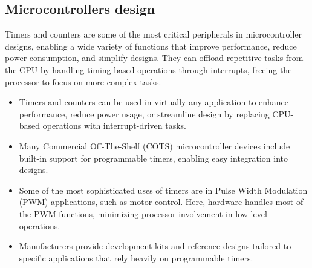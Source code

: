 \subsection{Microcontrollers design}
Timers and counters are some of the most critical peripherals in microcontroller designs, enabling a wide variety of functions that improve performance, reduce power consumption, and simplify designs. 
They can offload repetitive tasks from the CPU by handling timing-based operations through interrupts, freeing the processor to focus on more complex tasks.
\begin{itemize}
    \item Timers and counters can be used in virtually any application to enhance performance, reduce power usage, or streamline design by replacing CPU-based operations with interrupt-driven tasks.
    \item Many Commercial Off-The-Shelf (COTS) microcontroller devices include built-in support for programmable timers, enabling easy integration into designs.
    \item Some of the most sophisticated uses of timers are in Pulse Width Modulation (PWM) applications, such as motor control. 
        Here, hardware handles most of the PWM functions, minimizing processor involvement in low-level operations.
    \item Manufacturers provide development kits and reference designs tailored to specific applications that rely heavily on programmable timers.
\end{itemize}